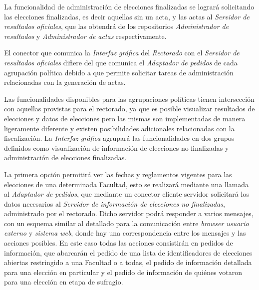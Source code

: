 La funcionalidad de administración de elecciones finalizadas se logrará solicitando las elecciones finalizadas, es decir aquellas sin un acta, y las actas al \emph{Servidor de resultados oficiales}, que las obtendrá de los repositorios \emph{Administrador de resultados} y \emph{Administrador de actas} respectivamente.

El conector que comunica la \emph{Interfaz gráfica} del \emph{Rectorado} con el \emph{Servidor de resultados oficiales} difiere del que comunica el \emph{Adaptador de pedidos} de cada agrupación política debido a que permite solicitar tareas de administración relacionadas con la generación de actas.




Las funcionalidades disponibles para las agrupaciones políticas tienen intersección con aquellas provistas para el rectorado, ya que es posible visualizar resultados de elecciones y datos de elecciones pero las mismas son implementadas de manera ligeramente diferente y existen posibilidades adicionales relacionadas con la fiscalización. La \emph{Interfaz gráfica} agrupará las funcionalidades en dos grupos definidos como visualización de información de elecciones no finalizadas y administración de elecciones finalizadas.


La primera opción permitirá ver las fechas y reglamentos vigentes para las elecciones de una determinada Facultad, esto se realizará mediante una llamada al \emph{Adaptador de pedidos}, que mediante un conector cliente servidor solicitará los datos necesarios al \emph{Servidor de información de elecciones no finalizadas}, administrado por el rectorado.  Dicho servidor podrá responder a varios mensajes, con un esquema similar al detallado para la comunicación entre \emph{browser usuario externo} y \emph{sistema web}, donde hay una correspondencia entre los mensajes y las acciones posibles. En este caso todas las acciones consistirán en pedidos de información, que abarcarán el pedido de una lista de identificadores de elecciones abiertas restringido a una Facultad o a todas, el pedido de información detallada para una elección en particular y el pedido de información de quiénes votaron para una elección en etapa de sufragio.




